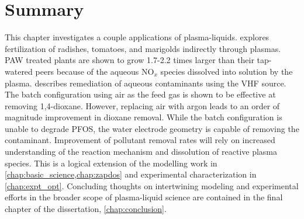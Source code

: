 \section{Summary}

This chapter investigates a couple applications of plasma-liquids.  explores fertilization of radishes, tomatoes, and marigolds indirectly through plasmas. PAW treated plants are shown to grow 1.7-2.2 times larger than their tap-watered peers because of the aqueous NO$_x$ species dissolved into solution by the plasma.  describes remediation of aqueous contaminants using the VHF source. The batch configuration using air as the feed gas is shown to be effective at removing 1,4-dioxane. However, replacing air with argon leads to an order of magnitude improvement in dioxane removal. While the batch configuration is unable to degrade PFOS, the water electrode geometry is capable of removing the contaminant. Improvement of pollutant removal rates will rely on increased understanding of the reaction mechanism and dissolution of reactive plasma species. This is a logical extension of the modelling work in \cref{chap:basic_science,chap:zapdos} and experimental characterization in \cref{chap:expt_opt}. Concluding thoughts on intertwining modeling and experimental efforts in the broader scope of plasma-liquid science are contained in the final chapter of the dissertation, \cref{chap:conclusion}.
